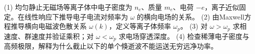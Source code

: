 (1) 均匀静止无磁场等离子体中电子密度为 \(n_e\)、质量 \(m_e\)、电荷 \(-e\)，离子近似固定。在线性响应下推导电子电流对频率为 \(\omega\) 的横向电场的关系。
(2) 由Maxwell方程推导横向电磁波色散关系 \(\omega(k)\)，定义等离子体频率 \(\omega_p\)。
(3) 对 \(\omega>\omega_p\) 求相速度、群速度并验证乘积；对 \(\omega<\omega_p\) 求电场穿透深度。
(4) 检查稀薄电子密度与高频极限，解释为什么截止以下的单个倏逝波不能运送无穷远净功率。

